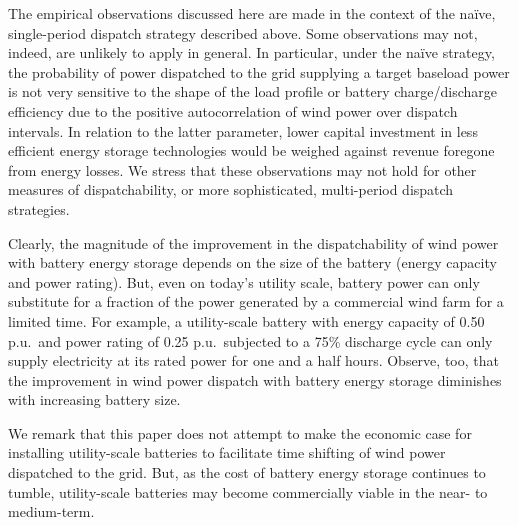 \documentclass[conference]{IEEEtran}
\begin{document}
The empirical observations discussed here are made in the context of the na\"ive, single-period dispatch strategy described above.  Some observations may not, indeed, are unlikely to apply in general.  In particular, under the na\"ive strategy, the probability of power dispatched to the grid supplying a target baseload power is not very sensitive to the shape of the load profile or battery charge/discharge efficiency due to the positive autocorrelation of wind power over dispatch intervals.  In relation to the latter parameter, lower capital investment in less efficient energy storage technologies would be weighed against revenue foregone from energy losses.  We stress that these observations may not hold for other measures of dispatchability, or more sophisticated, multi-period dispatch strategies.


Clearly, the magnitude of the improvement in the dispatchability of wind power with battery energy storage depends on the size of the battery (energy capacity and power rating).  But, even on today's utility scale, battery power can only substitute for a fraction of the power generated by a commercial wind farm for a limited time.  For example, a utility-scale battery with energy capacity of 0.50 p.u.\ and power rating of 0.25 p.u.\ subjected to a 75\% discharge cycle can only supply electricity at its rated power for one and a half hours.  Observe, too, that the improvement in wind power dispatch with battery energy storage diminishes with increasing battery size.

We remark that this paper does not attempt to make the economic case for installing utility-scale batteries to facilitate time shifting of wind power dispatched to the grid.  But, as the cost of battery energy storage continues to tumble, utility-scale batteries may become commercially viable in the near- to medium-term.
\end{document}
